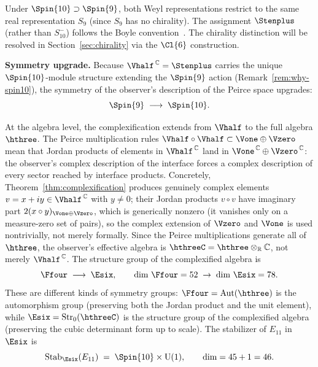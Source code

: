 \begin{remark}
Under $\Spin{10}\supset\Spin{9}$, both Weyl representations restrict
to the same real representation $S_9$ (since $S_9$ has no chirality).
The assignment $\Stenplus$ (rather than $S_{10}^-$) follows
the Boyle convention~\cite{Boyle2020}.  The chirality distinction
will be resolved in Section~\ref{sec:chirality} via the $\Cl{6}$
construction.
\end{remark}

\noindent\textbf{Symmetry upgrade.}
Because $\Vhalf^{\,\mathbb{C}} = \Stenplus$ carries the unique
$\Spin{10}$-module structure extending the $\Spin{9}$ action
(Remark~\ref{rem:why-spin10}), the symmetry of the observer's
description of the Peirce space upgrades:
\begin{equation}\label{eq:spin-upgrade}
  \Spin{9} \;\longrightarrow\; \Spin{10}.
\end{equation}

At the algebra level, the complexification extends from $\Vhalf$ to
the full algebra $\hthree$.  The Peirce multiplication rules
$\Vhalf\circ\Vhalf \subset \Vone\oplus\Vzero$ mean that Jordan
products of elements in $\Vhalf^{\,\mathbb{C}}$ land in
$\Vone^{\,\mathbb{C}}\oplus\Vzero^{\,\mathbb{C}}$: the observer's
complex description of the interface forces a complex description of
every sector reached by interface products.
Concretely, Theorem~\ref{thm:complexification} produces genuinely
complex elements $v = x + iy \in \Vhalf^{\,\mathbb{C}}$ with
$y \neq 0$; their Jordan products $v\circ v$ have imaginary part
$2(x\circ y)_{\Vone\oplus\Vzero}$, which is generically nonzero (it
vanishes only on a measure-zero set of pairs), so the complex
extension of $\Vzero$ and $\Vone$ is used nontrivially, not merely
formally.  Since the Peirce
multiplications generate all of $\hthree$, the observer's effective
algebra is $\hthreeC = \hthree\otimes_\mathbb{R}\mathbb{C}$, not
merely $\Vhalf^{\,\mathbb{C}}$.  The structure group of the
complexified algebra
is~\cite{Baez2002,Yokota2009,Boyle2020}
\begin{equation}\label{eq:F4-E6}
  \Ffour \;\longrightarrow\; \Esix,
  \qquad
  \dim\,\Ffour = 52 \;\to\; \dim\,\Esix = 78.
\end{equation}
These are different kinds of symmetry groups:
$\Ffour = \mathrm{Aut}(\hthree)$ is the automorphism group (preserving
both the Jordan product and the unit element), while
$\Esix = \mathrm{Str}_0(\hthreeC)$ is the structure group of the
complexified algebra (preserving the cubic determinant form up to
scale).  The stabilizer of $E_{11}$ in $\Esix$ is
\begin{equation}\label{eq:stab-E6}
  \mathrm{Stab}_{\Esix}(E_{11}) \;=\; \Spin{10}\times\mathrm{U}(1),
  \qquad
  \dim = 45 + 1 = 46.
\end{equation}

